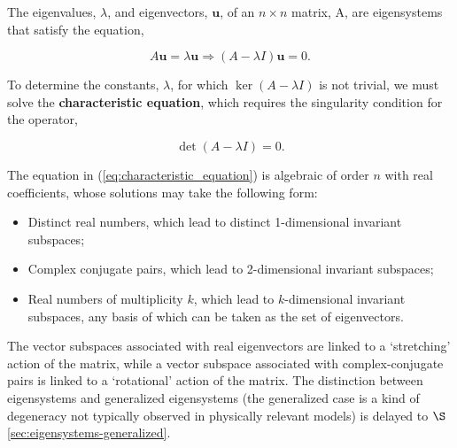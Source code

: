\documentclass[12pt, twoside, draft]{article}
\begin{document}
The eigenvalues, $\lambda$, and eigenvectors, $\mathbf{u}$, of an $n \times n$ matrix, A, are eigensystems that satisfy the equation,

\begin{equation}\label{eq:eigensystem_equation}
A \mathbf{u} = \lambda \mathbf{u} \Rightarrow (A - \lambda I) \mathbf{u} = 0.
\end{equation}

To determine the constants, $\lambda$, for which $\ker(A - \lambda I)$ is not trivial, we must solve the \textbf{characteristic equation}, which requires the singularity condition for the operator,

\begin{equation}\label{eq:characteristic_equation}
\det(A - \lambda I) = 0.
\end{equation}

The equation in (\ref{eq:characteristic_equation}) is algebraic of order $n$ with real coefficients, whose solutions may take the following form:
\begin{itemize}[noitemsep]
\item Distinct real numbers, which lead to distinct 1-dimensional invariant subspaces;
\item Complex conjugate pairs, which lead to 2-dimensional invariant subspaces;
\item Real numbers of multiplicity $k$, which lead to $k$-dimensional invariant subspaces, any basis of which can be taken as the set of eigenvectors.
\end{itemize}

The vector subspaces associated with real eigenvectors are linked to a `stretching' action of the matrix, while a vector subspace associated with complex-conjugate pairs is linked to a `rotational' action of the matrix.  The distinction between eigensystems and generalized eigensystems (the generalized case is a kind of degeneracy not typically observed in physically relevant models) is delayed to $\S$\ref{sec:eigensystems-generalized}.
\end{document}
